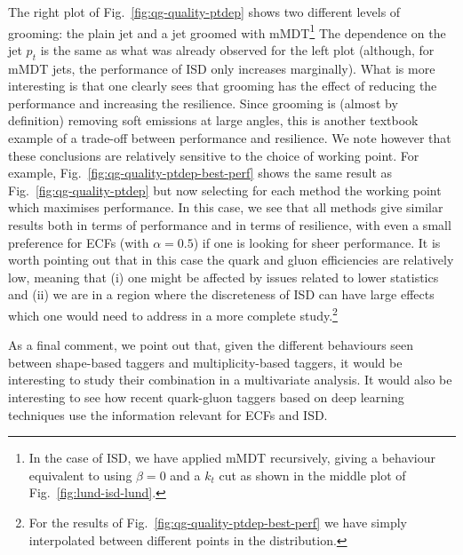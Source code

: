 The right plot of Fig.~\ref{fig:qg-quality-ptdep} shows two different
levels of grooming: the plain jet and a jet groomed with
mMDT\footnote{In the case of ISD, we have applied mMDT recursively,
  giving a behaviour equivalent to using $\beta=0$ and a $k_t$ cut as
  shown in the middle plot of Fig.~\ref{fig:lund-isd-lund}.}
%
The dependence on the jet $p_t$ is the same as what was already
observed for the left plot (although, for mMDT jets, the performance
of ISD only increases marginally). What is more interesting is that
one clearly sees that grooming has the effect of reducing the
performance and increasing the resilience.
%
Since grooming is (almost by definition) removing soft emissions at
large angles, this is another textbook example of a trade-off between
performance and resilience.
%
We note however that these conclusions are relatively sensitive to the
choice of working point. For example,
Fig.~\ref{fig:qg-quality-ptdep-best-perf} shows the same result as
Fig.~\ref{fig:qg-quality-ptdep} but now selecting for each method the
working point which maximises performance. In this case, we see that
all methods give similar results both in terms of performance and in
terms of resilience, with even a small preference for ECFs (with
$\alpha=0.5$) if one is looking for sheer performance. It is worth
pointing out that in this case the quark and gluon efficiencies are
relatively low, meaning that (i) one might be affected by issues
related to lower statistics and (ii) we are in a region where the
discreteness of ISD can have large effects which one would need to
address in a more complete study.\footnote{For the results of
  Fig.~\ref{fig:qg-quality-ptdep-best-perf} we have simply
  interpolated between different points in the distribution.}

As a final comment, we point out that, given the different
behaviours seen between shape-based taggers and multiplicity-based
taggers, it would be interesting to study their combination in a
multivariate analysis. It would also be interesting to see how recent
quark-gluon taggers based on deep learning techniques use the
information relevant for ECFs and ISD.




